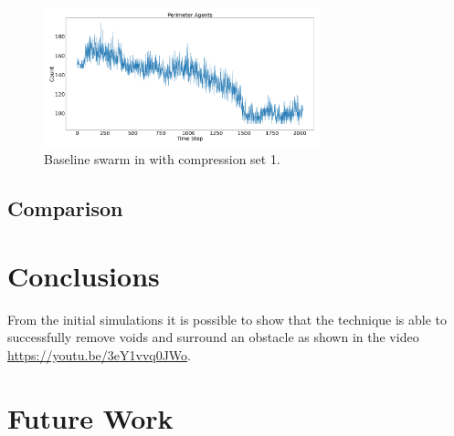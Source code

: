 \documentclass[12pt,a4paper]{IEEEtran}
\begin{document}
\begin{figure}[H]
	\begin{center}
		\includegraphics[width=8cm]{figures/baselineSwarmPerimeter1}
	\end{center}
	\caption{Baseline swarm in with compression set 1. \label{fig:baselineSwarmPerimeter1}}
\end{figure}

\subsection{Comparison}

\section{Conclusions}\label{conclusions}
From the initial simulations it is possible to show that the technique is able to successfully remove voids and surround an obstacle as shown in the video \href{https://youtu.be/3eY1vvq0JWo}{https://youtu.be/3eY1vvq0JWo}.

\section{Future Work}



\end{document}
